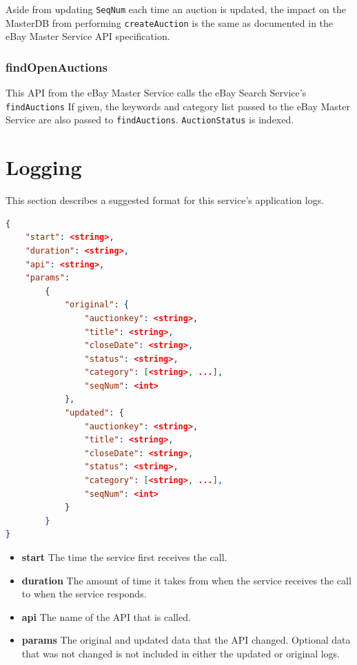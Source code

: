 \documentclass[12pt,a4paper]{article}
\begin{document}
\vspace{\baselineskip} 
Aside from updating \texttt{SeqNum} each time an auction is updated, the 
impact on the MasterDB from performing \texttt{createAuction} is the same as 
documented in the eBay Master Service API specification.

\subsubsection{findOpenAuctions}
This API from the eBay Master Service calls the eBay Search Service's \texttt{findAuctions}
If given, the keywords and category list passed to the eBay Master Service are also passed
to \texttt{findAuctions}. \texttt{AuctionStatus} is indexed.

\pagebreak
\section{Logging}

This section describes a suggested format for this service's application logs.


\begin{lstlisting}[boxpos=t,language=json,firstnumber=1]
{
    "start": <string>,
    "duration": <string>,
    "api": <string>,
    "params":
        {
            "original": {
                "auctionkey": <string>,
                "title": <string>,
                "closeDate": <string>,
                "status": <string>, 
                "category": [<string>, ...],
                "seqNum": <int> 
            }, 
            "updated": {
                "auctionkey": <string>,
                "title": <string>,
                "closeDate": <string>,
                "status": <string>,
                "category": [<string>, ...],
                "seqNum": <int> 
            }
        }
}           
\end{lstlisting}

\begin{itemize}
    \item \textbf{start} The time the service first receives the call.
    \item \textbf{duration} The amount of time it takes from when the service
        receives the call to when the service responds.
    \item \textbf{api} The name of the API that is called.
    \item \textbf{params} The original and updated data that the API changed.
        Optional data that was not changed is not included in either the
        updated or original logs.
\end{itemize}
\end{document}
